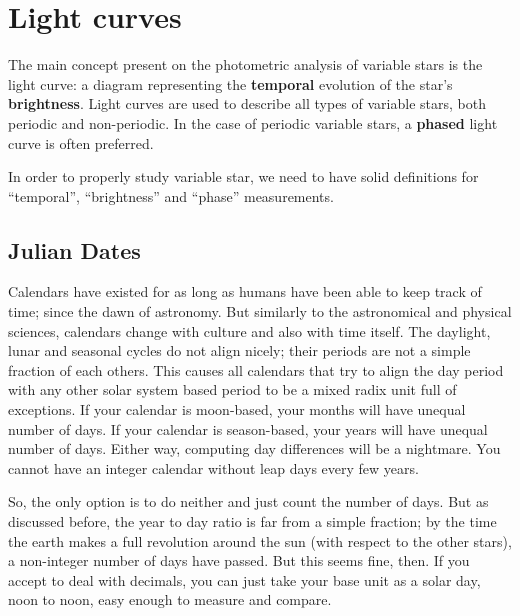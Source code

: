 \section{Light curves}

The main concept present on the photometric analysis of variable stars is the light curve:
a diagram representing the \textbf{temporal} evolution of the star's \textbf{brightness}. 
Light curves are used to describe all types of variable stars, both periodic and non-periodic. 
In the case of periodic variable stars, a \textbf{phased} light curve is often preferred.

In order to properly study variable star, we need to have solid definitions for \enquote{temporal}, 
\enquote{brightness} and \enquote{phase} measurements.

\subsection{Julian Dates}
	
	
	Calendars have existed for as long as humans have been able to keep track of time; since the dawn of astronomy.
	But similarly to the astronomical and physical sciences, calendars change with culture and also with time itself.
	The daylight, lunar and seasonal cycles do not align nicely; their periods are not a simple fraction of each others.
	This causes all calendars that try to align the day period with any other solar system based period to be a mixed radix unit full of exceptions.
	If your calendar is moon-based, your months will have unequal number of days.
	If your calendar is season-based, your years will have unequal number of days.
	Either way, computing day differences will be a nightmare. 
	You cannot have an integer calendar without leap days every few years.
	
	
	So, the only option is to do neither and just count the number of days. 
	But as discussed before, the year to day ratio is far from a simple fraction;
	by the time the earth makes a full revolution around the sun (with respect to the other stars),	a non-integer number of days have passed.
	But this seems fine, then. If you accept to deal with decimals, you can just take your base unit as a solar day, noon to noon,
	easy enough to measure and compare.
	
	
